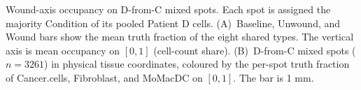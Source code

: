 Wound-axis occupancy on D-from-C mixed spots. Each spot is assigned the majority Condition of its pooled Patient D cells. (A)~Baseline, Unwound, and Wound bars show the mean truth fraction of the eight shared types. The vertical axis is mean occupancy on \([0,1]\) (cell-count share). (B)~D-from-C mixed spots (\(n=3261\)) in physical tissue coordinates, coloured by the per-spot truth fraction of Cancer.cells, Fibroblast, and MoMacDC on \([0,1]\). The bar is 1 mm.
